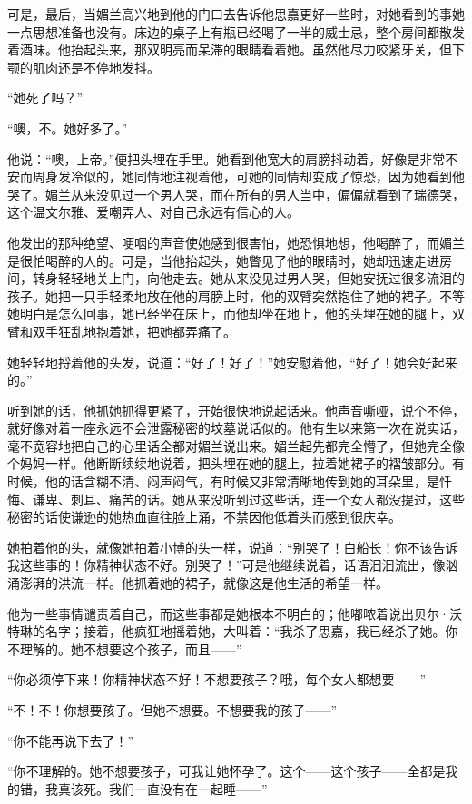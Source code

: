 \par 可是，最后，当媚兰高兴地到他的门口去告诉他思嘉更好一些时，对她看到的事她一点思想准备也没有。床边的桌子上有瓶已经喝了一半的威士忌，整个房间都散发着酒味。他抬起头来，那双明亮而呆滞的眼睛看着她。虽然他尽力咬紧牙关，但下颚的肌肉还是不停地发抖。
\par “她死了吗？”
\par “噢，不。她好多了。”
\par 他说：“噢，上帝。”便把头埋在手里。她看到他宽大的肩膀抖动着，好像是非常不安而周身发冷似的，她同情地注视着他，可她的同情却变成了惊恐，因为她看到他哭了。媚兰从来没见过一个男人哭，而在所有的男人当中，偏偏就看到了瑞德哭，这个温文尔雅、爱嘲弄人、对自己永远有信心的人。
\par 他发出的那种绝望、哽咽的声音使她感到很害怕，她恐惧地想，他喝醉了，而媚兰是很怕喝醉的人的。可是，当他抬起头，她瞥见了他的眼睛时，她却迅速走进房间，转身轻轻地关上门，向他走去。她从来没见过男人哭，但她安抚过很多流泪的孩子。她把一只手轻柔地放在他的肩膀上时，他的双臂突然抱住了她的裙子。不等她明白是怎么回事，她已经坐在床上，而他却坐在地上，他的头埋在她的腿上，双臂和双手狂乱地抱着她，把她都弄痛了。
\par 她轻轻地捋着他的头发，说道：“好了！好了！”她安慰着他，“好了！她会好起来的。”
\par 听到她的话，他抓她抓得更紧了，开始很快地说起话来。他声音嘶哑，说个不停，就好像对着一座永远不会泄露秘密的坟墓说话似的。他有生以来第一次在说实话，毫不宽容地把自己的心里话全都对媚兰说出来。媚兰起先都完全懵了，但她完全像个妈妈一样。他断断续续地说着，把头埋在她的腿上，拉着她裙子的褶皱部分。有时候，他的话含糊不清、闷声闷气，有时候又非常清晰地传到她的耳朵里，是忏悔、谦卑、刺耳、痛苦的话。她从来没听到过这些话，连一个女人都没提过，这些秘密的话使谦逊的她热血直往脸上涌，不禁因他低着头而感到很庆幸。
\par 她拍着他的头，就像她拍着小博的头一样，说道：“别哭了！白船长！你不该告诉我这些事的！你精神状态不好。别哭了！”可是他继续说着，话语汩汩流出，像汹涌澎湃的洪流一样。他抓着她的裙子，就像这是他生活的希望一样。
\par 他为一些事情谴责着自己，而这些事都是她根本不明白的；他嘟哝着说出贝尔·沃特琳的名字；接着，他疯狂地摇着她，大叫着：“我杀了思嘉，我已经杀了她。你不理解的。她不想要这个孩子，而且——”
\par “你必须停下来！你精神状态不好！不想要孩子？哦，每个女人都想要——”
\par “不！不！你想要孩子。但她不想要。不想要我的孩子——”
\par “你不能再说下去了！”
\par “你不理解的。她不想要孩子，可我让她怀孕了。这个——这个孩子——全都是我的错，我真该死。我们一直没有在一起睡——”
